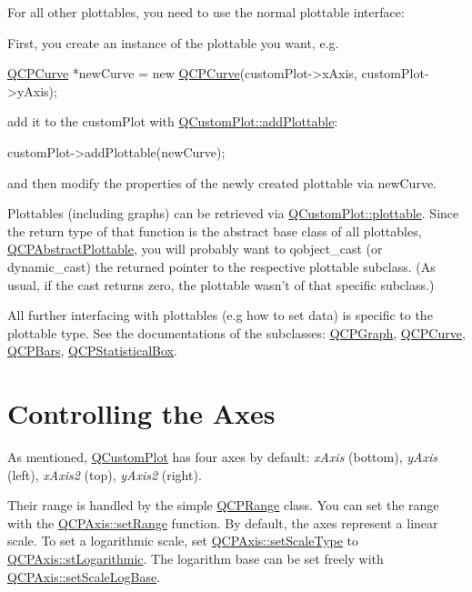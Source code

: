 For all other plottables, you need to use the normal plottable interface\-:\par
 First, you create an instance of the plottable you want, e.\-g. 
\begin{DoxyCode}
\hyperlink{classQCPCurve}{QCPCurve} *newCurve = \textcolor{keyword}{new} \hyperlink{classQCPCurve}{QCPCurve}(customPlot->xAxis, customPlot->yAxis);
\end{DoxyCode}
 add it to the custom\-Plot with \hyperlink{classQCustomPlot_ab7ad9174f701f9c6f64e378df77927a6}{Q\-Custom\-Plot\-::add\-Plottable}\-: 
\begin{DoxyCode}
customPlot->addPlottable(newCurve);
\end{DoxyCode}
 and then modify the properties of the newly created plottable via {\ttfamily new\-Curve}.

Plottables (including graphs) can be retrieved via \hyperlink{classQCustomPlot_a32de81ff53e263e785b83b52ecd99d6f}{Q\-Custom\-Plot\-::plottable}. Since the return type of that function is the abstract base class of all plottables, \hyperlink{classQCPAbstractPlottable}{Q\-C\-P\-Abstract\-Plottable}, you will probably want to qobject\-\_\-cast (or dynamic\-\_\-cast) the returned pointer to the respective plottable subclass. (As usual, if the cast returns zero, the plottable wasn't of that specific subclass.)

All further interfacing with plottables (e.\-g how to set data) is specific to the plottable type. See the documentations of the subclasses\-: \hyperlink{classQCPGraph}{Q\-C\-P\-Graph}, \hyperlink{classQCPCurve}{Q\-C\-P\-Curve}, \hyperlink{classQCPBars}{Q\-C\-P\-Bars}, \hyperlink{classQCPStatisticalBox}{Q\-C\-P\-Statistical\-Box}.\hypertarget{index_axes}{}\section{Controlling the Axes}\label{index_axes}
As mentioned, \hyperlink{classQCustomPlot}{Q\-Custom\-Plot} has four axes by default\-: {\itshape x\-Axis} (bottom), {\itshape y\-Axis} (left), {\itshape x\-Axis2} (top), {\itshape y\-Axis2} (right).

Their range is handled by the simple \hyperlink{classQCPRange}{Q\-C\-P\-Range} class. You can set the range with the \hyperlink{classQCPAxis_a57d6ee9e9009fe88cb19db476ec70bca}{Q\-C\-P\-Axis\-::set\-Range} function. By default, the axes represent a linear scale. To set a logarithmic scale, set \hyperlink{classQCPAxis_adb6c5c45bdf899ea221881dd3b43b406}{Q\-C\-P\-Axis\-::set\-Scale\-Type} to \hyperlink{classQCPAxis_a36d8e8658dbaa179bf2aeb973db2d6f0abf5b785ad976618816dc6f79b73216d4}{Q\-C\-P\-Axis\-::st\-Logarithmic}. The logarithm base can be set freely with \hyperlink{classQCPAxis_a726186054be90487885a748aa1b42188}{Q\-C\-P\-Axis\-::set\-Scale\-Log\-Base}.

